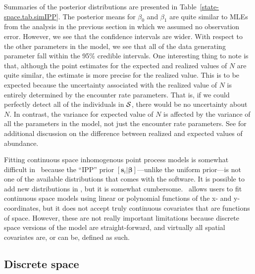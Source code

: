 Summaries of the posterior distributions are presented in
Table~\ref{state-space.tab.simIPP}. The posterior means for $\beta_0$
and $\beta_1$ are quite similar to MLEs from the analysis in the
previous section in which we assumed no observation error. However, we
see that the confidence intervals are wider. With respect to the other
parameters in the model, we see that all of the data
generating parameter fall within the 95\% credible intervals. One
interesting thing to note is that, although the point estimates for
the expected and realized values of $N$ are quite similar, the
estimate is more precise for the realized value. This is to be
expected because the uncertainty associated with the realized value of
$N$ is entirely determined by the encounter rate parameters. That is,
if we could perfectly detect all of the individuals in $\cal S$, there
would be no uncertainty about $N$. In contrast, the variance for
expected value of $N$ is affected by the variance of all the parameters
in the model, not just the encounter rate parameters. See
\citet{efford_fewster:2012} for additional discussion on the
difference between realized and expected values of abundance.


Fitting continuous space inhomogenous point process models is somewhat
difficult in \bugs~because the ``IPP'' prior $[\mathbf{s}_i | \bm
\beta]$---unlike the uniform prior---is not one of the
available distributions that comes with the software. It is
possible to add new distributions in \bugs, but it is somewhat
cumbersome.  \secr~allows
users to fit continuous space models using linear or polynomial functions of the x- and y-
coordinates, but it does not accept truly continuous covariates that
are functions of space. However, these
are not really important limitations because discrete
space versions of the model are straight-forward, and virtually all spatial
covariates are, or can be, defined as such.

\subsection{Discrete space}
\label{modeling.sec.discrete}

